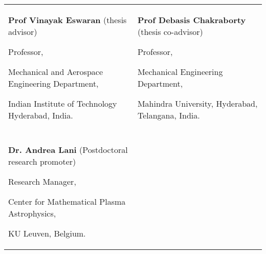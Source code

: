 {}

\begin{tabularx}{\textwidth}{@{}X X@{}}
\textbf{Prof Vinayak Eswaran} (thesis advisor)\par
Professor,\par
Mechanical and Aerospace Engineering Department,\par 
Indian Institute of Technology Hyderabad, India.\par 
\makefield{\faEnvelopeO}{\url{eswar@mae.iith.ac.in}}
& 
\textbf{Prof Debasis Chakraborty} (thesis co-advisor)\par
Professor,\par
Mechanical Engineering Department,\par 
Mahindra University, Hyderabad, Telangana, India.\par 
\makefield{\faEnvelopeO}{\url{debasisc.cfd@gmail.com}}
\\
\\
\textbf{Dr. Andrea Lani} (Postdoctoral research promoter)\par
Research Manager, \par
Center for Mathematical Plasma Astrophysics, \par
KU Leuven, Belgium.\par 
\makefield{\faEnvelopeO}{\url{andrea.lani@kuleuven.be}}



\end{tabularx}
